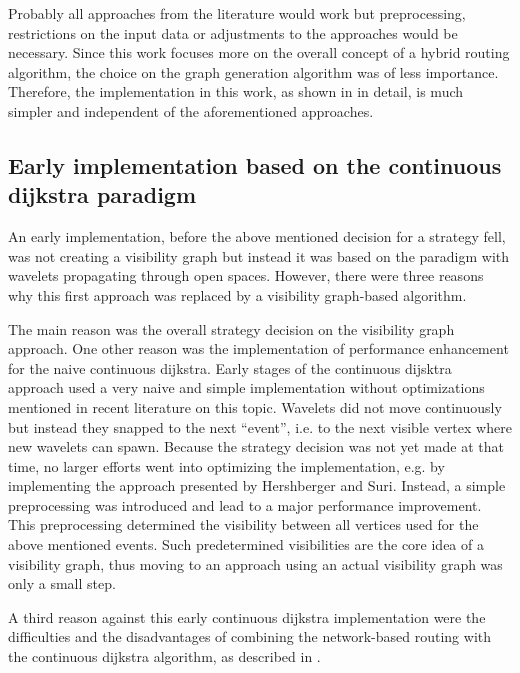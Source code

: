 		Probably all approaches from the literature would work but preprocessing, restrictions on the input data or adjustments to the approaches would be necessary.
		Since this work focuses more on the overall concept of a hybrid routing algorithm, the choice on the graph generation algorithm was of less importance.
		Therefore, the implementation in this work, as shown in  in detail, is much simpler and independent of the aforementioned approaches.
		
	\subsection{Early implementation based on the continuous dijkstra paradigm}
		
		An early implementation, before the above mentioned decision for a strategy fell, was not creating a visibility graph but instead it was based on the  paradigm with wavelets propagating through open spaces.
		However, there were three reasons why this first approach was replaced by a visibility graph-based algorithm.
		
		The main reason was the overall strategy decision on the visibility graph approach.
		One other reason was the implementation of performance enhancement for the naive continuous dijkstra.
		Early stages of the continuous dijsktra approach used a very naive and simple implementation without optimizations mentioned in recent literature on this topic.
		Wavelets did not move continuously but instead they snapped to the next \enquote{event}, i.e. to the next visible vertex where new wavelets can spawn.
		Because the strategy decision was not yet made at that time, no larger efforts went into optimizing the implementation, e.g. by implementing the approach presented by Hershberger and Suri\cite{hershberger-suri}.
		Instead, a simple preprocessing was introduced and lead to a major performance improvement.
		This preprocessing determined the visibility between all vertices used for the above mentioned events.
		Such predetermined visibilities are the core idea of a visibility graph, thus moving to an approach using an actual visibility graph was only a small step.
		
		A third reason against this early continuous dijkstra implementation were the difficulties and the disadvantages of combining the network-based routing with the continuous dijkstra algorithm, as described in .
		
